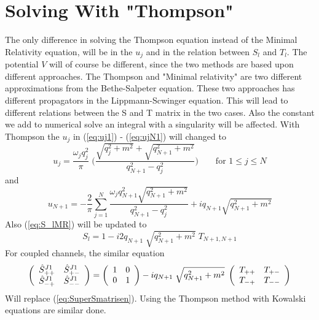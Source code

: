 \section{Solving With "Thompson"} 
The only difference in solving the Thompson equation instead of the Minimal Relativity equation, will be
in the $u_j$ and in the relation between $S_l$ and $T_l$. The potential $V$ will of course be different, 
since the two methods are based upon different approaches. 
The Thompson and "Minimal relativity" are two different approximations from the Bethe-Salpeter equation.
These two approaches has different propagators in the Lippmann-Scwinger equation. This will lead to different
relations between the S and T matrix in the two cases. Also the constant we add to numerical 
solve an integral with a singularity will be affected.
With Thompson the $u_j$ in (\ref{eq:uj1}) - (\ref{eq:ujN1}) will changed to
\begin{equation}
u_j=\frac{\omega_jq^2_j}{\pi}\;\bigg(\frac{\sqrt{q^2_j+m^2}+\sqrt{q^2_{N+1}+m^2}}{q^2_{N+1}-{ q^2_j}}\bigg)\qquad\textrm{for $1\le j\le N$}
\end{equation}
and
\begin{equation}
u_{N+1}=-\frac{2}{\pi}\sum^N_{j=1}\frac{\omega_jq^2_{N+1}\sqrt{q^2_{N+1}+m^2}}{{ q^2_{N+1}}-{ q^2_j}}+  i q_{N+1}\sqrt{q^2_{N+1}+m^2}
\end{equation}
Also (\ref{eq:S_lMR}) will be updated to 
\begin{equation}
S_l =1-i2q_{N+1}\;\sqrt{q^2_{N+1}+m^2}\; T_{N+1,N+1}
\end{equation}
For coupled channels, the similar equation
\begin{equation}
\left(
\begin{array}{cc} {{ \ensuremath{\hat{S}}^{J1}_{++} }}
&
{ \hat{S}^{J1}_{+-} } \\
\hat{S}^{J1}_{-+}
&
\hat{S}^{J1}_{--}
\end{array} \right)
=
\left(
\begin{array}{cc}
1 & 0\\
0 &1
\end{array} \right)
-iq_{N+1}\;\sqrt{q^2_{N+1}+m^2}\;
\left( \begin{array}{cc}
{T_{++}} &{T_{+-}} \\
{T_{-+}} &{T_{--}}
\end{array}\right)
\end{equation}
Will replace (\ref{eq:SuperSmatrisen}).
Using the Thompson method with Kowalski equations are similar done.








